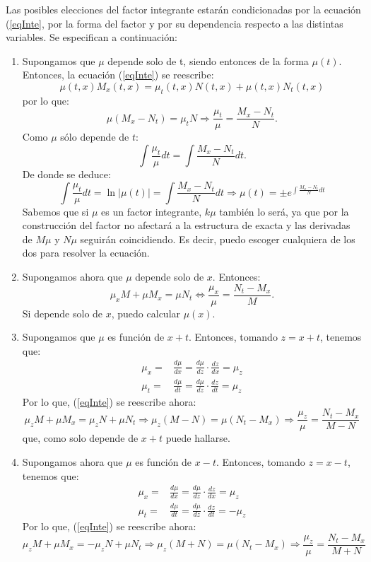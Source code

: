 \documentclass{article}
\providecommand{\abs}[1]{\lvert#1\rvert}
\theoremstyle{theorem-style}  %
\theoremstyle{definition-style}
\theoremstyle{example-style}
\begin{document}
Las posibles elecciones del factor integrante estarán condicionadas por la ecuación (\ref{eqInte}, por la forma del factor y por su dependencia respecto a las distintas variables. Se especifican a continuación:
\begin{enumerate}
	\item Supongamos que $\mu$ depende solo de t, siendo entonces de la forma $\mu(t)$. Entonces, la ecuación (\ref{eqInte}) se reescribe:
	\[\mu(t, x)M_x(t, x) = \mu_t(t, x)N(t, x) + \mu(t, x)N_t(t, x)\]
	por lo que:
	\[\mu\left( M_x-N_t\right) = \mu_t N \Rightarrow \frac{\mu_t}{\mu} = \frac{M_x - N_t}{N}.\]
	Como $ \mu $ sólo depende de $t$:
	\[\int \frac{\mu_t}{\mu}dt = \int \frac{M_x - N_t}{N}dt.\]
	De donde se deduce:
	\[ \int \frac{\mu_t}{\mu}dt = \ln\abs{\mu(t)}= \int \frac{M_x - N_t}{N}dt\Rightarrow \mu(t)=\pm e^{\int \frac{M_x - N_t}{N}dt}\]
	Sabemos que si $ \mu $ es un factor integrante, $ k\mu $ también lo será, ya que por la construcción del factor no afectará a la estructura de exacta y las derivadas de $ M\mu $ y $ N\mu $ seguirán coincidiendo. Es decir, puedo escoger cualquiera de los dos para resolver la ecuación.
	\item Supongamos ahora que $\mu$ depende solo de $x$. Entonces:
	\[\mu_xM + \mu M_x = \mu N_t \Leftrightarrow \frac{\mu_x}{\mu} = \frac{N_t - M_x}{M}.\]
	Si depende solo de $x$, puedo calcular $\mu (x)$.
	\item  Supongamos que $\mu$ es función de $x+t$. Entonces, tomando $z=x+t$, tenemos que:
	\begin{align*}
		\mu_x = & \frac{d\mu}{dx} = \frac{d\mu}{dz} \cdot \frac{dz}{dx} = \mu_z \\
		\mu_t = & \frac{d\mu}{dt} = \frac{d\mu}{dz} \cdot \frac{dz}{dt} = \mu_z 
	\end{align*}
	Por lo que, (\ref{eqInte}) se reescribe ahora:
	\[\mu_z M + \mu M_x = \mu_z N + \mu N_t \Rightarrow \mu_z (M-N) = \mu (N_t - M_x) \Rightarrow \frac{\mu_z}{\mu} = \frac{N_t - M_x}{M - N}\]
	que, como solo depende de $x+t$ puede hallarse.
	\item Supongamos ahora que $\mu$ es función de $x-t$. Entonces, tomando $z=x-t$, tenemos que:
	\begin{align*}
	\mu_x = & \frac{d\mu}{dx} = \frac{d\mu}{dz} \cdot \frac{dz}{dx} = \mu_z \\
	\mu_t = & \frac{d\mu}{dt} = \frac{d\mu}{dz} \cdot \frac{dz}{dt} = -\mu_z 
	\end{align*}
	Por lo que, (\ref{eqInte}) se reescribe ahora:
	\[\mu_z M + \mu M_x = -\mu_z N + \mu N_t \Rightarrow \mu_z (M+N) = \mu (N_t - M_x) \Rightarrow \frac{\mu_z}{\mu} = \frac{N_t - M_x}{M + N}\]

\end{enumerate}
\end{document}
